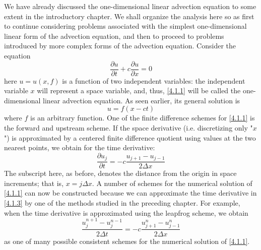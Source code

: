 We have already discussed the one-dimensional linear advection equation to some extent in the introductory chapter. We shall organize the analysis here so as first to continue considering problems associated with the simplest one-dimensional linear form of the advection equation, and then to proceed to problems introduced by more complex forms of the advection equation.
Consider the equation
\begin{equation}\label{4.1.1}
    \frac{\partial u}{\partial t}+c\frac{\partial u}{\partial x}=0
\end{equation}
here $u=u(x,f)$ is a function of two independent variables: the independent variable $x$ will represent a space variable, and, thus, \ref{4.1.1} will be called the one-dimensional linear advection equation. As seen earlier, its general solution is
$$u=f(x-ct)$$ where $f$ is an arbitrary function.
One of the finite difference schemes for \ref{4.1.1} is the forward and upstream scheme. If the space derivative (i.e. discretizing only "$x$") is approximated by a centered finite difference quotient using values at the two nearest points, we obtain for the time derivative:
\begin{equation}\label{4.1.3}
    \frac{\partial u_j}{\partial t}=-c\frac{u_{j+1}-u_{j-1}}{2\Delta x}
\end{equation}
The subscript here, as before, denotes the distance from the origin in space increments; that is, $x=j\Delta x$. A number of schemes for the numerical solution of \ref{4.1.1} can now be constructed because we can approximate the time derivative in \ref{4.1.3} by one of the methods studied in the preceding chapter. For example, when the time derivative is approximated using the leapfrog scheme, we obtain
\begin{equation}\label{4.1.4}
    \frac{u^{n+1}_j-u^{n-1}_j}{2\Delta t}=-c\frac{u_{j+1}^n-u_{j-1}^n}{2\Delta x}
\end{equation}
as one of many possible consistent schemes for the numerical solution of \ref{4.1.1}.

